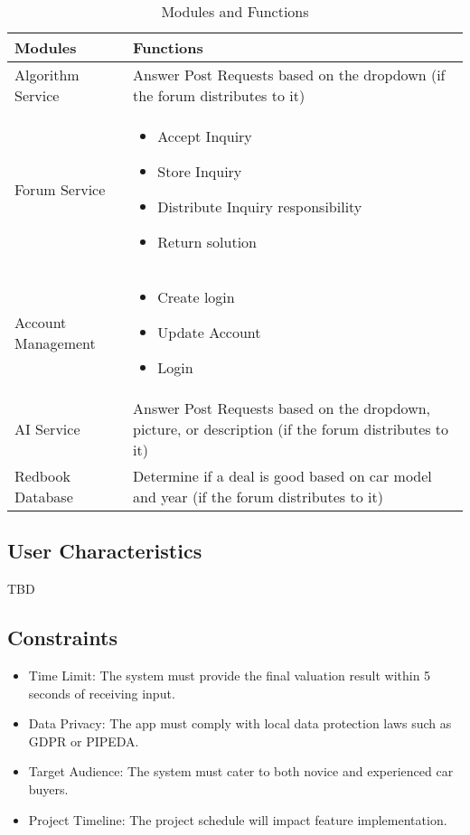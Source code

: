 \documentclass[]{article}
\begin{document}
\begin{table}[h]
    \centering
    \renewcommand{\arraystretch}{1.5}
    \begin{tabular}{|l|p{10cm}|}
        \hline
        \textbf{Modules} & \textbf{Functions} \\ 
        \hline
        Algorithm Service & Answer Post Requests based on the dropdown (if the forum distributes to it) \\ 
        \hline
        Forum Service & 
        \begin{itemize}
            \item Accept Inquiry
            \item Store Inquiry
            \item Distribute Inquiry responsibility
            \item Return solution
        \end{itemize} \\ 
        \hline
        Account Management & 
        \begin{itemize}
            \item Create login
            \item Update Account
            \item Login
        \end{itemize} \\ 
        \hline
        AI Service & Answer Post Requests based on the dropdown, picture, or description (if the forum distributes to it) \\ 
        \hline
        Redbook Database & Determine if a deal is good based on car model and year (if the forum distributes to it) \\ 
        \hline
    \end{tabular}
    \caption{Modules and Functions}
    \label{tab:modules_functions}
\end{table}


\subsection{User Characteristics}
\label{sub:user_characteristics}
TBD

\subsection{Constraints}
\label{sub:constraints}
\begin{itemize}
    \item Time Limit: The system must provide the final valuation result within 5 seconds of receiving input.
    \item Data Privacy: The app must comply with local data protection laws such as GDPR or PIPEDA.
    \item Target Audience: The system must cater to both novice and experienced car buyers.
    \item Project Timeline: The project schedule will impact feature implementation.
\end{itemize}
\end{document}
